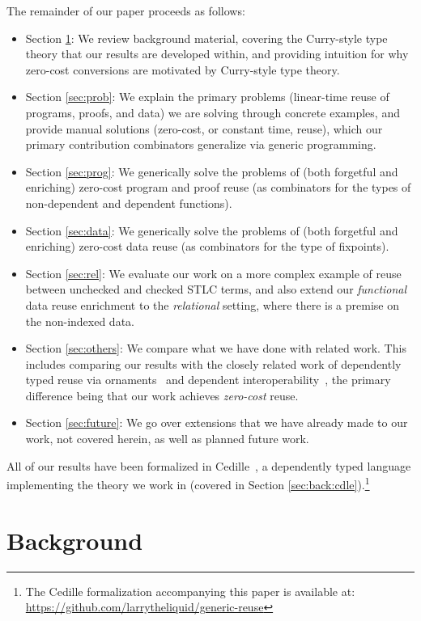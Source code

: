 \documentclass[acmsmall,screen]{acmart}
\newcommand{\refsec}[1]{Section \ref{sec:#1}}
\newcommand{\labsec}[1]{\label{sec:#1}}
\begin{document}
The remainder of our paper proceeds as follows:
\begin{itemize}
\item{\refsec{back}:} We review background material, covering the
  Curry-style type theory that our results are developed within, and
  providing intuition for why zero-cost conversions are motivated by
  Curry-style type theory.
\item{\refsec{prob}:} We explain the primary problems
  (linear-time reuse of programs, proofs, and data) we are solving
  through concrete examples, and provide manual solutions (zero-cost,
  or constant time, reuse), which our
  primary contribution combinators generalize via generic programming.
\item{\refsec{prog}:} We generically solve the problems of
  (both forgetful and enriching) zero-cost
  program and proof reuse (as combinators for the types of non-dependent
  and dependent functions).
\item{\refsec{data}:} We generically solve the problems of
  (both forgetful and enriching) zero-cost
  data reuse (as combinators for the type of fixpoints).
\item{\refsec{rel}:} We evaluate our work on a more complex example of
  reuse between unchecked and checked STLC terms, and also extend our
  \textit{functional} data reuse enrichment to the \textit{relational}
  setting, where there is a premise on the non-indexed data.
\item{\refsec{others}: We compare what we have done with related
  work. This includes comparing our results with the closely related
  work of dependently typed reuse via
  ornaments~\cite{ornaments:original} and
  dependent interoperability~\cite{dagand:interop}, the primary
  difference being that our work achieves \textit{zero-cost} reuse.}
\item{\refsec{future}: We go over extensions that we have already made
  to our work, not covered herein, as well as planned future work.}
\end{itemize}
All of our results have been formalized in
Cedille~\cite{stump17a,stump18,lang:cedille}, a dependently typed language
implementing the theory we work in
(covered in \refsec{back:cdle}).\footnote{
  \raggedright{The Cedille formalization accompanying this paper is available at:\\
  \url{https://github.com/larrytheliquid/generic-reuse}}
}

\section{Background}
\labsec{back}
\end{document}
